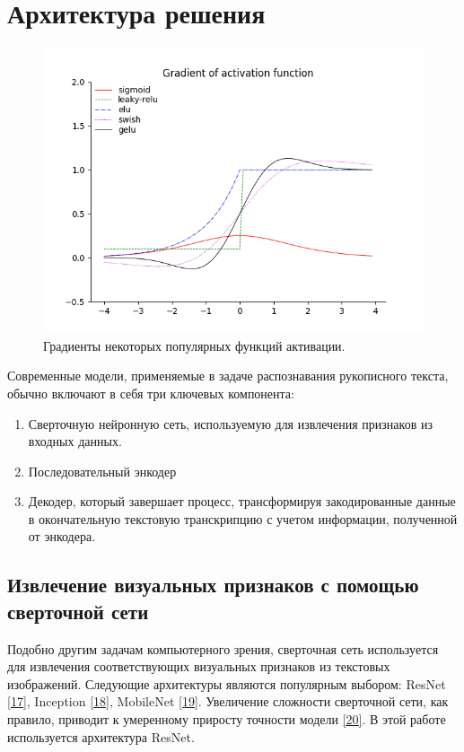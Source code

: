 \section{Архитектура решения}
\label{sec:Chapter1} 

\begin{figure}
    \centering
    \includegraphics[scale=1]{./images/activation-funs-grad.png}
    \caption{\protect\hypertarget{image1}{Градиенты некоторых популярных функций активации.}}
\end{figure}


Современные модели, применяемые в задаче распознавания рукописного текста, обычно включают в себя три ключевых компонента:
\begin{enumerate}
\item Сверточную нейронную сеть, используемую для извлечения признаков из входных данных.
\item Последовательный энкодер
\item Декодер, который завершает процесс, трансформируя закодированные данные в окончательную текстовую транскрипцию с учетом информации, полученной от энкодера.
\end{enumerate}

\subsection{Извлечение визуальных признаков с помощью сверточной сети}
Подобно другим задачам компьютерного зрения, сверточная сеть используется для извлечения соответствующих визуальных признаков из текстовых изображений. Следующие архитектуры являются популярным выбором: ResNet \hyperlink{cite.Kai15}{[17]}, Inception \hyperlink{cite.Sze14}{[18]}, MobileNet \hyperlink{cite.San18}{[19]}. Увеличение сложности сверточной сети, как правило, приводит к умеренному приросту точности модели \hyperlink{cite.Her21}{[20]}. В этой работе используется архитектура ResNet. 

